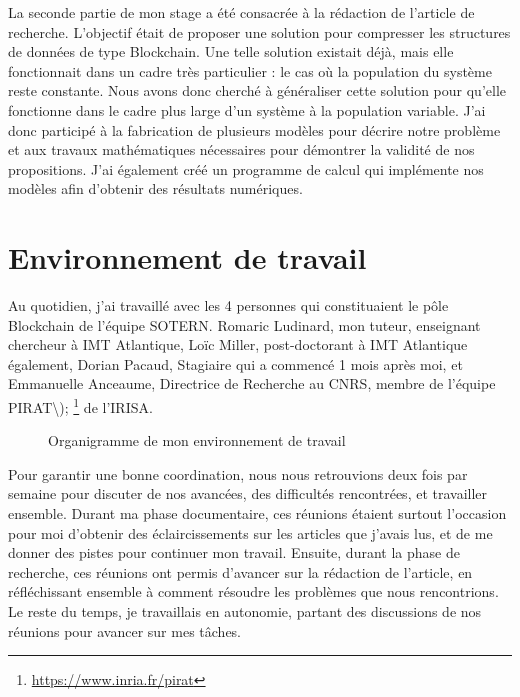     La seconde partie de mon stage a été consacrée à la rédaction de l'article
    de recherche. L'objectif était de proposer une solution pour compresser les
    structures de données de type Blockchain. Une telle solution existait déjà,
    mais elle fonctionnait dans un cadre très particulier : le cas où la
    population du système reste constante. Nous avons donc cherché à généraliser
    cette solution pour qu'elle fonctionne dans le cadre plus large d'un système
    à la population variable. J'ai donc participé à la fabrication de plusieurs
    modèles pour décrire notre problème et aux travaux mathématiques nécessaires
    pour démontrer la validité de nos propositions. J'ai également créé un
    programme de calcul qui implémente nos modèles afin d'obtenir des résultats
    numériques.


\section{Environnement de travail}\label{sec:contexte_de_travail}

    Au quotidien, j'ai travaillé avec les 4 personnes qui constituaient le pôle
    Blockchain de l'équipe SOTERN. Romaric Ludinard, mon tuteur, enseignant
    chercheur à IMT Atlantique, Loïc Miller, post-doctorant à IMT Atlantique
    également, Dorian Pacaud, Stagiaire qui a commencé 1 mois après moi, et
    Emmanuelle Anceaume, Directrice de Recherche au CNRS, membre de l'équipe
    PIRAT\textbackslash\textquotesingle);
    \footnote{\href{https://www.inria.fr/pirat}{https://www.inria.fr/pirat}} de
    l'IRISA.

    \vspace{0.4cm}
    \begin{figure}[ht]
        \centering
        
        \caption{Organigramme de mon environnement de travail}
        \label{fig:organigramme}
    \end{figure}

    Pour garantir une bonne coordination, nous nous retrouvions deux fois par
    semaine pour discuter de nos avancées, des difficultés rencontrées, et
    travailler ensemble. Durant ma phase documentaire, ces réunions étaient
    surtout l'occasion pour moi d'obtenir des éclaircissements sur les articles
    que j'avais lus, et de me donner des pistes pour continuer mon travail.
    Ensuite, durant la phase de recherche, ces réunions ont permis d'avancer sur
    la rédaction de l'article, en réfléchissant ensemble à comment résoudre les
    problèmes que nous rencontrions. Le reste du temps, je travaillais en
    autonomie, partant des discussions de nos réunions pour avancer sur mes
    tâches.
